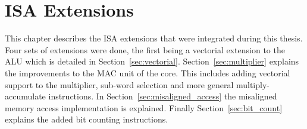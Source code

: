 

\chapter{ISA Extensions}

\label{chapter:vectorial}



This chapter describes the \gls{ISA} extensions that were integrated during this
thesis. Four sets of extensions were done, the first being a vectorial
extension to the \gls{ALU} which is detailed in Section~\ref{sec:vectorial}.
Section~\ref{sec:multiplier} explains the improvements to the \gls{MAC} unit of
the core. This includes adding vectorial support to the multiplier, sub-word
selection and more general multiply-accumulate instructions.
In Section~\ref{sec:misaligned_access} the misaligned memory access
implementation is explained.
Finally Section~\ref{sec:bit_count} explains the added bit counting instructions.

